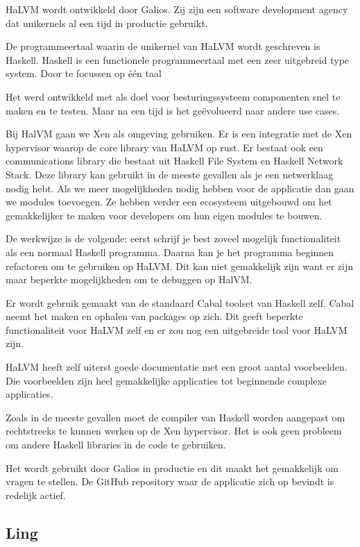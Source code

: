 \documentclass[pdftex,a4paper,12pt,twoside]{report}
\begin{document}
HaLVM wordt ontwikkeld door Galios. Zij zijn een software development agency dat unikernels al een tijd in productie gebruikt.

De programmeertaal waarin de unikernel van HaLVM wordt geschreven is Haskell. Haskell is een functionele programmeertaal met een zeer uitgebreid type system. Door te focussen op één taal 

Het werd ontwikkeld met als doel voor besturingssysteem componenten snel te maken en te testen. Maar na een tijd is het geëvolueerd naar andere use cases.

Bij HalVM gaan we Xen als omgeving gebruiken. Er is een integratie met de Xen hypervisor waarop de core library van HaLVM op rust. Er bestaat ook een communications library die bestaat uit Haskell File System en Haskell Network Stack. Deze library kan gebruikt in de meeste gevallen als je een netwerklaag nodig hebt. Als we meer mogelijkheden nodig hebben voor de applicatie dan gaan we modules toevoegen. Ze hebben verder een ecosysteem uitgebouwd om het gemakkelijker te maken voor developers om hun eigen modules te bouwen.

De werkwijze is de volgende: eerst schrijf je best zoveel mogelijk functionaliteit als een normaal Haskell programma. Daarna kan je het programma beginnen refactoren om te gebruiken op HaLVM.
Dit kan niet gemakkelijk zijn want er zijn maar beperkte mogelijkheden om te debuggen op HalVM.

Er wordt gebruik gemaakt van de standaard Cabal toolset van Haskell zelf. Cabal neemt het maken en ophalen van packages op zich. Dit geeft beperkte functionaliteit voor HaLVM zelf en er zou nog een uitgebreide tool voor HaLVM zijn.

HaLVM heeft zelf uiterst goede documentatie met een groot aantal voorbeelden. Die voorbeelden zijn heel gemakkelijke applicaties tot beginnende complexe applicaties.

Zoals in de meeste gevallen moet de compiler van Haskell worden aangepast om rechtstreeks te kunnen werken op de Xen hypervisor. Het is ook geen probleem om andere Haskell libraries in de code te gebruiken.

Het wordt gebruikt door Galios in productie en dit maakt het gemakkelijk om vragen te stellen. De GitHub repository waar de applicatie zich op bevindt is redelijk actief.

\subsection{Ling}
\end{document}
